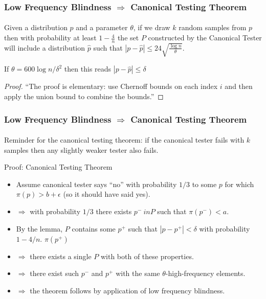 \documentclass{beamer}
\begin{document}
\begin{frame}
  \frametitle{Low Frequency Blindness $\Rightarrow$ Canonical Testing
    Theorem} \framesubtitle{}
  \begin{lemma}
    Given a distribution $p$ and a parameter $\theta$, if we draw $k$
    random samples from $p$ then with probability at least
    $1-\frac{4}{n}$ the set $P$ constructed by the Canonical Tester
    will include a distribution $\hat{p}$ such that $|p-\hat p
    |\le 24\sqrt{\frac{\log n}{\theta}}$.
  \end{lemma}
  If $\theta = 600\log n / \delta^2$ then this reads $|p-\hat p
    |\le \delta$
  \begin{proof}
    ``The proof is elementary: use Chernoff bounds on each index $i$
    and then apply the union bound to combine the bounds.''
  \end{proof}
\end{frame}


\begin{frame}
  \frametitle{Low Frequency Blindness $\Rightarrow$ Canonical Testing
    Theorem} \framesubtitle{}

  Reminder for the canonical testing theorem: if the canonical tester
  fails with $k$ samples then any slightly weaker tester also fails.
  
  \begin{block}{Proof: Canonical Testing Theorem}
    \begin{itemize}
    \item Assume canonical tester says ``no'' with probability $1/3$
      to some $p$ for which $\pi(p)>b+\epsilon$ (so it should have
      said yes).
    \item $\Rightarrow$ with probability $1/3$ there exists $p^-\ in
      P$ such that $\pi(p^-)<a$.
    \item By the lemma, $P$ contains some $p^+$ such that
      $|p-p^+|<\delta$ with probability $1-4/n$. $\pi(p^+)$
    \item $\Rightarrow$ there exists a single $P$ with both of these
      properties.
    \item $\Rightarrow$ there exist such $p^-$ and $p^+$ with the same
      $\theta$-high-frequency elements.
    \item $\Rightarrow$ the theorem follows by application of low
      frequency blindness.
    \end{itemize}
  \end{block}
\end{frame}
\end{document}
